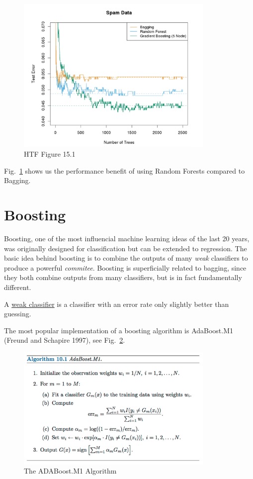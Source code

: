 \documentclass[a4paper]{article}
\begin{document}
\begin{figure}
\centering
\includegraphics[width=0.85\textwidth]{Fig151.png}
\caption{\label{fig:fig151}HTF Figure 15.1 }
\end{figure}

Fig.~\ref{fig:fig151} shows us the performance benefit of using Random Forests compared to Bagging.

\section{Boosting}
Boosting, one of the most influencial machine learning ideas of the last 20 years, was originally designed for classification but can be extended to regression. The basic idea behind boosting is to combine the outputs of many \textit{weak} classifiers to produce a powerful \textit{commitee}. Boosting is superficially related to bagging, since they both combine outputs from many classifiers, but is in fact fundamentally different. 

\begin{definition}
A \underline{weak classifier} is a classifier with an error rate only slightly  better than guessing.
\end{definition}

The most popular implementation of a boosting algorithm is AdaBoost.M1 (Freund and Schapire 1997), see Fig.~\ref{fig:adaboost}. 

\begin{figure}
\centering
\includegraphics[width=0.85\textwidth]{adaboost.png}
\caption{\label{fig:adaboost}The ADABoost.M1 Algorithm }
\end{figure}
\end{document}
